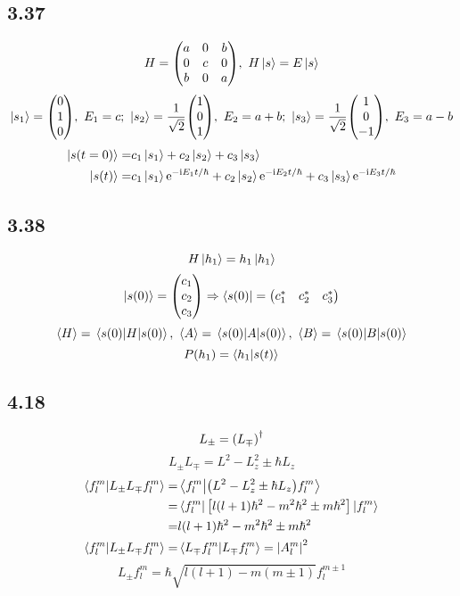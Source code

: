 \subsection{3.37}
\begin{framed}
    \[
        H = \mqty(a & 0 & b \\ 0 & c & 0 \\ b & 0 & a),\ H \ket{s} = E \ket{s}
    \] \[
        \ket{s_1} = \mqty(0 \\ 1 \\ 0),\ E_1 = c;\ \ket{s_2} = \frac{1}{\sqrt{2}} \mqty(1 \\ 0 \\ 1),\ E_2 = a + b;\ \ket{s_3} = \frac{1}{\sqrt{2}} \mqty(1 \\ 0 \\ - 1),\ E_3 = a - b
    \] \begin{align*}
        \ket{s(t = 0)} = & c_1 \ket{s_1} + c_2 \ket{s_2} + c_3 \ket{s_3}                                                                                     \\
        \ket{s(t)} =     & c_1 \ket{s_1} \mathrm{e}^{- \mathrm{i} E_1 t / \hbar} + c_2 \ket{s_2} \mathrm{e}^{- \mathrm{i} E_2 t / \hbar} + c_3 \ket{s_3} \mathrm{e}^{- \mathrm{i} E_3 t / \hbar}
    \end{align*}
\end{framed}

\subsection{3.38}
\begin{framed}
    \[
        H \ket{h_1} = h_1 \ket{h_1}
    \] \[
        \ket{s(0)} = \mqty(c_1 \\ c_2 \\ c_3) \Rightarrow \bra{s(0)} = \mqty(c_1^* & c_2^* & c_3^*)
    \] \[
        \expval{H} = \ev{H}{s(0)},\ \expval{A} = \ev{A}{s(0)},\ \expval{B} = \ev{B}{s(0)}
    \] \[
        P(h_1) = \braket{h_1}{s(t)}
    \]
\end{framed}

\subsection{4.18}
\begin{framed}
    \[
        L_{\pm} = \qty(L_{\mp})^{\dagger}
    \] \[
        L_{\pm} L_{\mp} = L^2 - L_z^2 \pm \hbar L_z
    \] \begin{align*}
        \braket{f_l^m}{L_{\pm} L_{\mp} f_l^m} = & \braket{f_l^m}{\qty(L^2 - L_z^2 \pm \hbar L_z) f_l^m}                      \\
        =                                       & \bra{f_l^m} \qty[l(l + 1) \hbar^2 - m^2 \hbar^2 \pm m \hbar^2] \ket{f_l^m} \\
        =                                       & l(l + 1) \hbar^2 - m^2 \hbar^2 \pm m \hbar^2                               \\
        \braket{f_l^m}{L_{\pm} L_{\mp} f_l^m} = & \braket{L_{\mp} f_l^m}{L_{\mp} f_l^m} = \qty|A_l^m|^2
    \end{align*} \[
        L_{\pm} f_l^m = \hbar \sqrt{l(l + 1) - m(m \pm 1)} f_l^{m \pm 1}
    \]
\end{framed}

